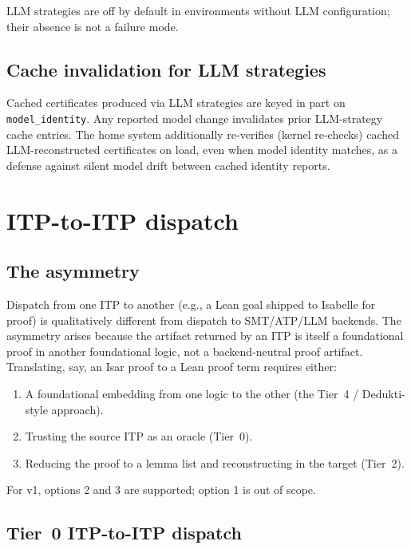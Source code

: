 \documentclass[11pt,letterpaper]{article}
\theoremstyle{definition}
\theoremstyle{remark}
\begin{document}
LLM strategies are off by default in environments without LLM
configuration; their absence is not a failure mode.

\subsection{Cache invalidation for LLM strategies}

Cached certificates produced via LLM strategies are keyed in part on
\texttt{model\_identity}. Any reported model change invalidates
prior LLM-strategy cache entries. The home system additionally
re-verifies (kernel re-checks) cached LLM-reconstructed certificates
on load, even when model identity matches, as a defense against silent
model drift between cached identity reports.

\section{ITP-to-ITP dispatch}
\label{sec:itp-itp}

\subsection{The asymmetry}

Dispatch from one ITP to another (e.g., a Lean goal shipped to Isabelle
for proof) is qualitatively different from dispatch to SMT/ATP/LLM
backends. The asymmetry arises because the artifact returned by an ITP
is itself a foundational proof in another foundational logic, not a
backend-neutral proof artifact. Translating, say, an Isar proof to a
Lean proof term requires either:

\begin{enumerate}[leftmargin=2em]
  \item A foundational embedding from one logic to the other (the
        Tier~4 / Dedukti-style approach).
  \item Trusting the source ITP as an oracle (Tier~0).
  \item Reducing the proof to a lemma list and reconstructing in the
        target (Tier~2).
\end{enumerate}

For v1, options 2 and 3 are supported; option 1 is out of scope.

\subsection{Tier~0 ITP-to-ITP dispatch}
\end{document}
